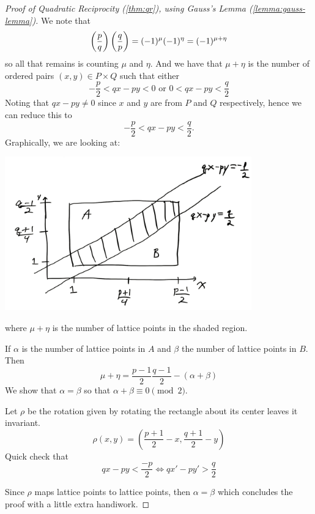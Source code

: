 \begin{proof}[Proof of Quadratic Reciprocity (\cref{thm:qr}), using Gauss's Lemma (\cref{lemma:gauss-lemma})]
    We note that
    \[\left(\dfrac{p}{q}\right)\left(\dfrac{q}{p}\right) = (-1)^\mu (-1)^\eta = (-1)^{\mu+\eta}\]
    so all that remains is counting $\mu$ and $\eta$. And we have that $\mu + \eta$ is the number of ordered pairs $(x, y)\in P\times Q$ such that either
    \[-\frac{p}{2} < qx - py < 0 \text{ or } 0 < qx - py < \frac{q}{2}\]
    Noting that $qx - py\neq 0$ since $x$ and $y$ are from $P$ and $Q$ respectively, hence we can reduce this to
    \[-\frac{p}{2} < qx - py < \frac{q}{2}.\]
    Graphically, we are looking at:
    \begin{center}
        \includegraphics[width=0.8\textwidth]{images/qr-diagram.png}
    \end{center}

    where $\mu + \eta$ is the number of lattice points in the shaded region.

    If $\alpha$ is the number of lattice points in $A$ and $\beta$ the number of lattice points in $B$. Then
    \[\mu + \eta = \frac{p-1}{2}\frac{q-1}{2} - (\alpha + \beta)\]
    We show that $\alpha = \beta$ so that $\alpha + \beta \equiv 0\pmod{2}$.

    Let $\rho$ be the rotation given by rotating the rectangle about its center leaves it invariant.
    \[\rho(x, y) = \left(\frac{p+1}{2}-x, \frac{q+1}{2} - y\right)\]
    Quick check that
    \[qx - py < \frac{-p}{2} \Leftrightarrow qx' - py' > \frac{q}{2}\]

    Since $\rho$ maps lattice points to lattice points, then $\alpha = \beta$ which concludes the proof with a little extra handiwork.
\end{proof}

